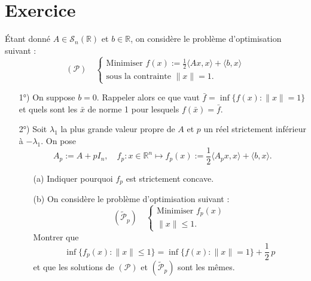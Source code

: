 \documentclass[11pt, a4paper]{article}
\begin{document}
\section*{Exercice}
%
\'Etant donné $A\in\mathcal{S}_n(\mathbb{R})$ et $b\in\mathbb{R}$, on considère
le problème d'optimisation suivant :
%
\[
(\mathcal{P})\quad \left\{\begin{array}{l}
\mbox{Minimiser } f(x):= \frac{1}{2} \langle A x,x \rangle +\langle b,x \rangle\\ [1.1ex]
\mbox{sous la contrainte } \|x\|=1.
\end{array}\right.
\]
\begin{itemize}
\item [1°)] On suppose $b=0$. Rappeler alors ce que vaut 
$\bar f = \inf\{ f(x): \|x\|=1 \}$ et quels sont les $\bar x$ de norme 1 pour lesquels
$f(\bar x)=\bar f$.
%
\item [2°)] Soit $\lambda_1$ la plus grande valeur propre de $A$ et $p$ un réel strictement
inférieur à $-\lambda_1$. On pose
\[
A_p := A + p I_n,\quad 
f_p : x\in\mathbb{R}^n \mapsto f_p(x) := \frac{1}{2}\langle A_p x,x \rangle
+\langle b,x \rangle.
\]
	\begin{itemize}
	\item [(a)] Indiquer pourquoi $f_p$ est strictement concave.
	\item [(b)] On considère le problème d'optimisation suivant :
	\[
(\tilde{\mathcal{P}}_p)\quad \left\{\begin{array}{l}
\mbox{Minimiser } f_p(x)\\ [1.1ex]
 \|x\|\leq 1.
\end{array}\right.
\]
Montrer que
\[
\inf\{ f_p(x):\|x\|\leq 1 \} = \inf\{ f(x):\|x\|=1 \}+\frac{1}{2}\, p
\]
et que les solutions de $(\mathcal{P})$ et $(\tilde{\mathcal{P}}_p)$ sont les mêmes.
%	
\end{itemize}
\end{itemize}
%
\end{document}
